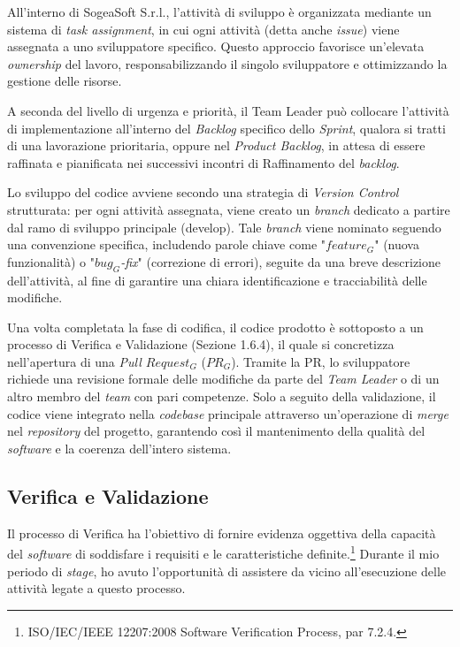         
        \noindent All'interno di SogeaSoft S.r.l., l'attività di sviluppo è organizzata mediante un sistema di \textit{task assignment}, in cui ogni attività (detta anche \textit{issue}) viene assegnata a uno sviluppatore specifico. Questo approccio favorisce un’elevata \textit{ownership} del lavoro, responsabilizzando il singolo sviluppatore e ottimizzando la gestione delle risorse.

        \noindent A seconda del livello di urgenza e priorità, il Team Leader può collocare l’attività di implementazione all’interno del \textit{Backlog} specifico dello \textit{Sprint}, qualora si tratti di una lavorazione prioritaria, oppure nel \textit{Product Backlog}, in attesa di essere raffinata e pianificata nei successivi incontri di Raffinamento del \textit{backlog}.

        \noindent Lo sviluppo del codice avviene secondo una strategia di \textit{Version Control} strutturata: per ogni attività assegnata, viene creato un \textit{branch} dedicato a partire dal ramo di sviluppo principale (develop). Tale \textit{branch} viene nominato seguendo una convenzione specifica, includendo parole chiave come "\textit{$feature_G$}" (nuova funzionalità) o "\textit{$bug_G$-fix}" (correzione di errori), seguite da una breve descrizione dell’attività, al fine di garantire una chiara identificazione e tracciabilità delle modifiche.


        \noindent Una volta completata la fase di codifica, il codice prodotto è sottoposto a un processo di Verifica e Validazione (Sezione 1.6.4), il quale si concretizza nell'apertura di una \textit{Pull $Request_G$} ($PR_G$). Tramite la PR, lo sviluppatore richiede una revisione formale delle modifiche da parte del \textit{Team Leader} o di un altro membro del \textit{team} con pari competenze. Solo a seguito della validazione, il codice viene integrato nella \textit{codebase} principale attraverso un'operazione di \textit{merge} nel \textit{repository} del progetto, garantendo così il mantenimento della qualità del \textit{software} e la coerenza dell’intero sistema.

        
        \subsection{Verifica e Validazione}
        Il processo di Verifica ha l’obiettivo di fornire evidenza oggettiva della capacità del \textit{software} di soddisfare i requisiti e le caratteristiche definite.\footnote{ISO/IEC/IEEE 12207:2008 Software Verification Process, par 7.2.4.} Durante il mio periodo di \textit{stage}, ho avuto l'opportunità di assistere da vicino all'esecuzione delle attività legate a questo processo.

